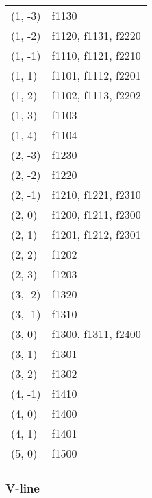 \documentclass[openright,twoside,headsepline,bibliography=totoc]{scrbook}
\begin{document}
\begin{longtable}[]{@{}ll@{}}
(1, -3) & f1130 \\
(1, -2) & f1120, f1131, f2220 \\
(1, -1) & f1110, f1121, f2210 \\
(1, 1) & f1101, f1112, f2201 \\
(1, 2) & f1102, f1113, f2202 \\
(1, 3) & f1103 \\
(1, 4) & f1104 \\
(2, -3) & f1230 \\
(2, -2) & f1220 \\
(2, -1) & f1210, f1221, f2310 \\
(2, 0) & f1200, f1211, f2300 \\
(2, 1) & f1201, f1212, f2301 \\
(2, 2) & f1202 \\
(2, 3) & f1203 \\
(3, -2) & f1320 \\
(3, -1) & f1310 \\
(3, 0) & f1300, f1311, f2400 \\
(3, 1) & f1301 \\
(3, 2) & f1302 \\
(4, -1) & f1410 \\
(4, 0) & f1400 \\
(4, 1) & f1401 \\
(5, 0) & f1500 \\
\bottomrule()
\end{longtable}

\hypertarget{v-line}{%
\subsubsection{V-line}\label{v-line}}
\end{document}
